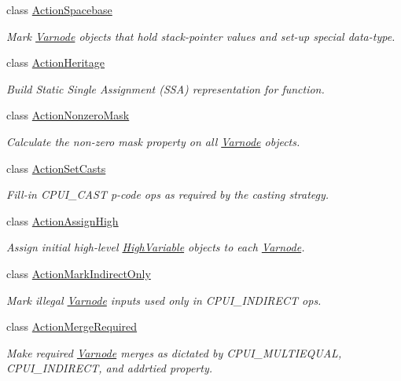 \begin{DoxyCompactItemize}
class \mbox{\hyperlink{class_action_spacebase}{Action\+Spacebase}}
\begin{DoxyCompactList}\small\item\em Mark \mbox{\hyperlink{class_varnode}{Varnode}} objects that hold stack-\/pointer values and set-\/up special data-\/type. \end{DoxyCompactList}\item 
class \mbox{\hyperlink{class_action_heritage}{Action\+Heritage}}
\begin{DoxyCompactList}\small\item\em Build Static Single Assignment (S\+SA) representation for function. \end{DoxyCompactList}\item 
class \mbox{\hyperlink{class_action_nonzero_mask}{Action\+Nonzero\+Mask}}
\begin{DoxyCompactList}\small\item\em Calculate the non-\/zero mask property on all \mbox{\hyperlink{class_varnode}{Varnode}} objects. \end{DoxyCompactList}\item 
class \mbox{\hyperlink{class_action_set_casts}{Action\+Set\+Casts}}
\begin{DoxyCompactList}\small\item\em Fill-\/in C\+P\+U\+I\+\_\+\+C\+A\+ST p-\/code ops as required by the casting strategy. \end{DoxyCompactList}\item 
class \mbox{\hyperlink{class_action_assign_high}{Action\+Assign\+High}}
\begin{DoxyCompactList}\small\item\em Assign initial high-\/level \mbox{\hyperlink{class_high_variable}{High\+Variable}} objects to each \mbox{\hyperlink{class_varnode}{Varnode}}. \end{DoxyCompactList}\item 
class \mbox{\hyperlink{class_action_mark_indirect_only}{Action\+Mark\+Indirect\+Only}}
\begin{DoxyCompactList}\small\item\em Mark illegal \mbox{\hyperlink{class_varnode}{Varnode}} inputs used only in C\+P\+U\+I\+\_\+\+I\+N\+D\+I\+R\+E\+CT ops. \end{DoxyCompactList}\item 
class \mbox{\hyperlink{class_action_merge_required}{Action\+Merge\+Required}}
\begin{DoxyCompactList}\small\item\em Make {\itshape required} \mbox{\hyperlink{class_varnode}{Varnode}} merges as dictated by C\+P\+U\+I\+\_\+\+M\+U\+L\+T\+I\+E\+Q\+U\+AL, C\+P\+U\+I\+\_\+\+I\+N\+D\+I\+R\+E\+CT, and {\itshape addrtied} property. \end{DoxyCompactList}\item 

\end{DoxyCompactItemize}
